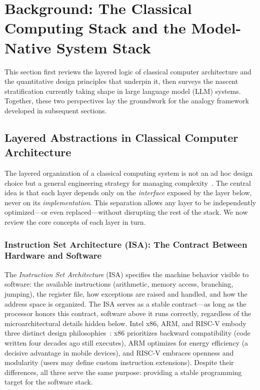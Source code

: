 \documentclass[11pt,a4paper]{article}
\begin{document}
\section{Background: The Classical Computing Stack and the Model-Native System Stack}
\label{sec:background}

This section first reviews the layered logic of classical computer architecture and the quantitative design principles that underpin it, then surveys the nascent stratification currently taking shape in large language model (LLM) systems. Together, these two perspectives lay the groundwork for the analogy framework developed in subsequent sections.

\subsection{Layered Abstractions in Classical Computer Architecture}

The layered organization of a classical computing system is not an ad hoc design choice but a general engineering strategy for managing complexity~\cite{hennessy2017quantitative}.
The central idea is that each layer depends only on the \emph{interface} exposed by the layer below, never on its \emph{implementation}.
This separation allows any layer to be independently optimized---or even replaced---without disrupting the rest of the stack.
We now review the core concepts of each layer in turn.

\subsubsection{Instruction Set Architecture (ISA): The Contract Between Hardware and Software}

The \textit{Instruction Set Architecture} (ISA) specifies the machine behavior visible to software: the available instructions (arithmetic, memory access, branching, jumping), the register file, how exceptions are raised and handled, and how the address space is organized.
The ISA serves as a stable contract---as long as the processor honors this contract, software above it runs correctly, regardless of the microarchitectural details hidden below.
Intel x86, ARM, and RISC-V embody three distinct design philosophies~\cite{intel_sdm_2026,riscv_spec_2026}: x86 prioritizes backward compatibility (code written four decades ago still executes), ARM optimizes for energy efficiency (a decisive advantage in mobile devices), and RISC-V embraces openness and modularity (users may define custom instruction extensions).
Despite their differences, all three serve the same purpose: providing a stable programming target for the software stack.
\end{document}
